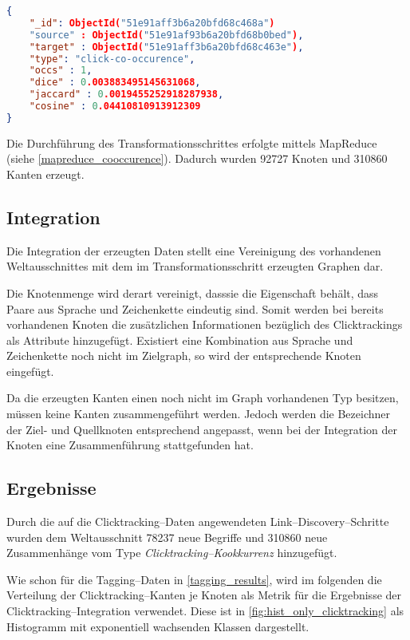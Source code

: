 \begin{lstlisting}[language=json, label={lst:click_edge}, caption={JSON--Beispiel für ein aus den Clicktracking--Daten erzeugtes Kantenobjekt}]
{
    "_id": ObjectId("51e91aff3b6a20bfd68c468a")
    "source" : ObjectId("51e91af93b6a20bfd68b0bed"),
    "target" : ObjectId("51e91aff3b6a20bfd68c463e"),
    "type": "click-co-occurence",
    "occs" : 1,
    "dice" : 0.003883495145631068,
    "jaccard" : 0.0019455252918287938,
    "cosine" : 0.04410810913912309
}
\end{lstlisting}

Die Durchführung des Transformationsschrittes erfolgte mittels MapReduce (siehe \cref{mapreduce_cooccurence}). Dadurch wurden \num{92727} Knoten und \num{310860} Kanten erzeugt.

\subsection{Integration}
\label{click_integration}

Die Integration der erzeugten Daten stellt eine Vereinigung des vorhandenen Weltausschnittes mit dem im Transformationsschritt erzeugten Graphen dar.

Die Knotenmenge wird derart vereinigt, dasssie die Eigenschaft behält, dass Paare aus Sprache und Zeichenkette eindeutig sind. Somit werden bei bereits vorhandenen Knoten die zusätzlichen Informationen bezüglich des Clicktrackings als Attribute hinzugefügt. Existiert eine Kombination aus Sprache und Zeichenkette noch nicht im Zielgraph, so wird der entsprechende Knoten eingefügt.

Da die erzeugten Kanten einen noch nicht im Graph vorhandenen Typ besitzen, müssen keine Kanten zusammengeführt werden. Jedoch werden die Bezeichner der Ziel- und Quellknoten entsprechend angepasst, wenn bei der Integration der Knoten eine Zusammenführung stattgefunden hat.

\subsection{Ergebnisse}

Durch die auf die Clicktracking--Daten angewendeten Link--Discovery--Schritte wurden dem Weltausschnitt \num{78237} neue Begriffe und \num{310860} neue Zusammenhänge vom Type \emph{Clicktracking--Kookkurrenz} hinzugefügt.

Wie schon für die Tagging--Daten in \cref{tagging_results}, wird im folgenden die Verteilung der Clicktracking--Kanten je Knoten als Metrik für die Ergebnisse der Clicktracking--Integration verwendet. Diese ist in \cref{fig:hist_only_clicktracking} als Histogramm mit exponentiell wachsenden Klassen dargestellt.

